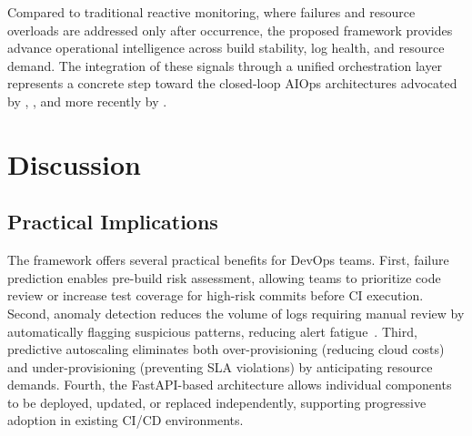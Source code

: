 \documentclass[a4paper,fleqn]{cas-dc}
\begin{document}
\begin{table}[htbp]
\centering
\caption{Comparison with related work}\label{tab:comparison}
\end{table}

Compared to traditional reactive monitoring, where failures and resource overloads are addressed only after occurrence, the proposed framework provides advance operational intelligence across build stability, log health, and resource demand.
The integration of these signals through a unified orchestration layer represents a concrete step toward the closed-loop AIOps architectures advocated by \citet{dang2019aiops}, \citet{notaro2021aiops}, and more recently by \citet{zota2025agentic}.

\section{Discussion}\label{sec:discussion}

\subsection{Practical Implications}\label{subsec:practical}

The framework offers several practical benefits for DevOps teams.
First, failure prediction enables pre-build risk assessment, allowing teams to prioritize code review or increase test coverage for high-risk commits before CI execution.
Second, anomaly detection reduces the volume of logs requiring manual review by automatically flagging suspicious patterns, reducing alert fatigue~\citep{dang2019aiops}.
Third, predictive autoscaling eliminates both over-provisioning (reducing cloud costs) and under-provisioning (preventing SLA violations) by anticipating resource demands.
Fourth, the FastAPI-based architecture allows individual components to be deployed, updated, or replaced independently, supporting progressive adoption in existing CI/CD environments.
\end{document}
